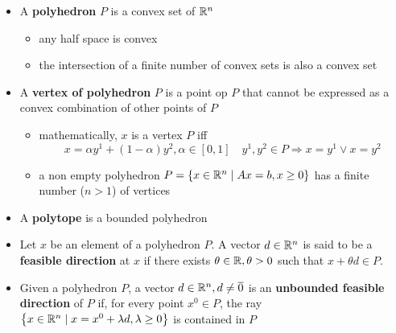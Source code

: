 \documentclass[english]{article}
\begin{document}
\begin{itemize}
\begin{itemize}[label=\(\rightarrow\)]
        \end{itemize}
  \item A \textbf{polyhedron} \(P\) is a convex set of \(\mathbb{R}^n\)
        \begin{itemize}
          \item any half space is convex
          \item the intersection of a finite number of convex sets is also a convex set
        \end{itemize}
  \item A \textbf{vertex of polyhedron} \(P\) is a point op \(P\) that cannot be expressed as a convex combination of other points of \(P\)
        \begin{itemize}
          \item mathematically, \(x\) is a vertex \(P\) iff
                \[ x = \alpha y^1 + (1 - \alpha) y^2, \alpha \in \left[ 0, 1 \right] \quad y^1, y^2 \in P \Rightarrow x = y^1 \lor x = y^2 \]
          \item a non empty polyhedron \(P = \left\{ x \in \mathbb{R}^n \mid  Ax = b, x \geq 0 \right\}\) has a finite number (\(n >1\)) of vertices
        \end{itemize}
  \item A \textbf{polytope} is a bounded polyhedron
  \item Let \(x\) be an element of a polyhedron \(P\). A vector \(d \in \mathbb{R}^n\) is said to be a \textbf{feasible direction} at \(x\) if there exists \(\theta \in \mathbb{R}, \theta > 0\) such that \(x + \theta d \in P\).
  \item Given a polyhedron \(P\), a vector \(d \in \mathbb{R}^n, d \neq \overline{0}\) is an \textbf{unbounded feasible direction} of \(P\) if, for every point \(x^0 \in P\), the ray \(\left\{ x \in \mathbb{R}^n \mid   x = x^0 + \lambda d, \lambda \geq 0 \right\}\) is contained in \(P\)
\end{itemize}
\end{document}
